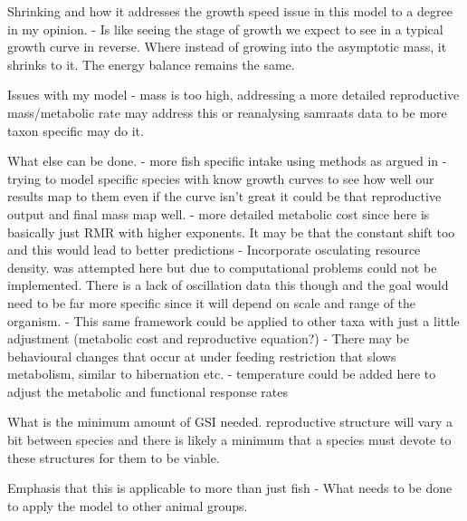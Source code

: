 \documentclass[a4paper, 11pt, hidelinks]{article} %
\begin{document}
	Shrinking and how it addresses the growth speed issue in this model to a degree in my opinion.
	- Is like seeing the stage of growth we expect to see in a typical growth curve in reverse.  Where instead of growing into the asymptotic mass, it shrinks to it.  The energy balance remains the same.
	
	Issues with my model
	- mass is too high, addressing a more detailed reproductive mass/metabolic rate may address this or reanalysing samraats data to be more taxon specific may do it.
	
	What else can be done.
	- more fish specific intake using \cite{Pawar2012} methods as argued in \cite{Marshall2019}
	- trying to model specific species with know growth curves to see how well our results map to them even if the curve isn't great it could be that reproductive output and final mass map well.
	- more detailed metabolic cost since here is basically just RMR with higher exponents.  It may be that the constant shift too and this would lead to better predictions
	- Incorporate osculating resource density.  was attempted here but due to computational problems could not be implemented.  There is a lack of oscillation data this though and the goal would need to be far more specific since it will depend on scale and range of the organism.
	- This same framework could be applied to other taxa with just a little adjustment (metabolic cost and reproductive equation?)
	- There may be behavioural changes that occur at under feeding restriction that slows metabolism, similar to hibernation etc.
	- temperature could be added here to adjust the metabolic and functional response rates %
	
	What is the minimum amount of GSI needed. reproductive structure will vary a bit between species and there is likely a minimum that a species must devote to these structures for them to be viable. %
	
	Emphasis that this is applicable to more than just fish - What needs to be done to apply the model to other animal groups. %
	\nolinenumbers
\end{document}
